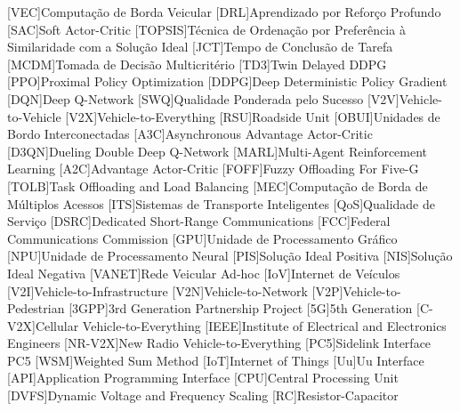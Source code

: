 [VEC]{Computação de Borda Veicular}
[DRL]{Aprendizado por Reforço Profundo}
[SAC]{Soft Actor-Critic}
[TOPSIS]{Técnica de Ordenação por Preferência à Similaridade com a Solução Ideal}
[JCT]{Tempo de Conclusão de Tarefa}
[MCDM]{Tomada de Decisão Multicritério}
[TD3]{Twin Delayed DDPG}
[PPO]{Proximal Policy Optimization}
[DDPG]{Deep Deterministic Policy Gradient}
[DQN]{Deep Q-Network}
[SWQ]{Qualidade Ponderada pelo Sucesso}
[V2V]{Vehicle-to-Vehicle}
[V2X]{Vehicle-to-Everything}
[RSU]{Roadside Unit}
[OBUI]{Unidades de Bordo Interconectadas}
[A3C]{Asynchronous Advantage Actor-Critic}
[D3QN]{Dueling Double Deep Q-Network}
[MARL]{Multi-Agent Reinforcement Learning}
[A2C]{Advantage Actor-Critic}
[FOFF]{Fuzzy Offloading For Five-G}
[TOLB]{Task Offloading and Load Balancing}
[MEC]{Computação de Borda de Múltiplos Acessos}
[ITS]{Sistemas de Transporte Inteligentes}
[QoS]{Qualidade de Serviço}
[DSRC]{Dedicated Short-Range Communications}
[FCC]{Federal Communications Commission}
[GPU]{Unidade de Processamento Gráfico}
[NPU]{Unidade de Processamento Neural}
[PIS]{Solução Ideal Positiva}
[NIS]{Solução Ideal Negativa}
[VANET]{Rede Veicular Ad-hoc}
[IoV]{Internet de Veículos}
[V2I]{Vehicle-to-Infrastructure}
[V2N]{Vehicle-to-Network}
[V2P]{Vehicle-to-Pedestrian}
[3GPP]{3rd Generation Partnership Project}
[5G]{5th Generation}
[C-V2X]{Cellular Vehicle-to-Everything}
[IEEE]{Institute of Electrical and Electronics Engineers}
[NR-V2X]{New Radio Vehicle-to-Everything}
[PC5]{Sidelink Interface PC5}
[WSM]{Weighted Sum Method}
[IoT]{Internet of Things}
[Uu]{Uu Interface}
[API]{Application Programming Interface}
[CPU]{Central Processing Unit}
[DVFS]{Dynamic Voltage and Frequency Scaling}
[RC]{Resistor-Capacitor}